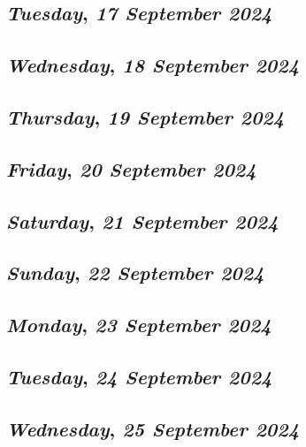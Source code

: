 \def\day{\textit{17 September 2024}}
\def\weekday{\textit{Tuesday}}
\subsection*{\weekday, \day}

\def\day{\textit{18 September 2024}}
\def\weekday{\textit{Wednesday}}
\subsection*{\weekday, \day}

\def\day{\textit{19 September 2024}}
\def\weekday{\textit{Thursday}}
\subsection*{\weekday, \day}

\def\day{\textit{20 September 2024}}
\def\weekday{\textit{Friday}}
\subsection*{\weekday, \day}

\def\day{\textit{21 September 2024}}
\def\weekday{\textit{Saturday}}
\subsection*{\weekday, \day}

\def\day{\textit{22 September 2024}}
\def\weekday{\textit{Sunday}}
\subsection*{\weekday, \day}

\def\day{\textit{23 September 2024}}
\def\weekday{\textit{Monday}}
\subsection*{\weekday, \day}

\def\day{\textit{24 September 2024}}
\def\weekday{\textit{Tuesday}}
\subsection*{\weekday, \day}

\def\day{\textit{25 September 2024}}
\def\weekday{\textit{Wednesday}}
\subsection*{\weekday, \day}

